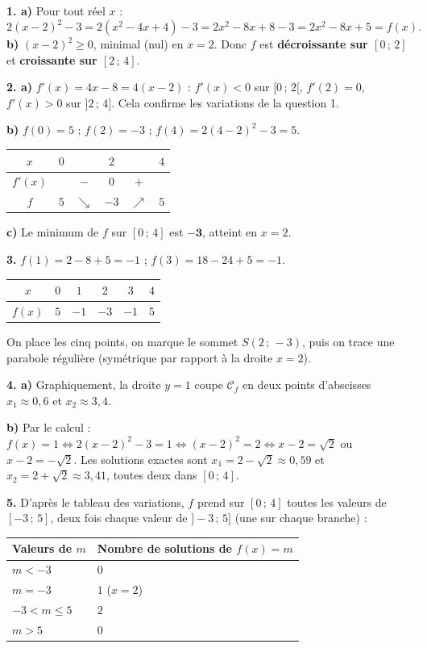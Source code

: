 \documentclass[11pt]{article}
\begin{document}
\begin{corrige}
\textbf{1. a)} Pour tout réel $x$ :
\[ 2(x-2)^{2}-3=2(x^{2}-4x+4)-3=2x^{2}-8x+8-3=2x^{2}-8x+5=f(x). \]
\textbf{b)} $(x-2)^{2}\geq 0$, minimal (nul) en $x=2$. Donc $f$ est \textbf{décroissante sur $[0\,;\,2]$} et \textbf{croissante sur $[2\,;\,4]$}.

\textbf{2. a)} $f'(x)=4x-8=4(x-2)$ : $f'(x)<0$ sur $[0\,;\,2[$, $f'(2)=0$, $f'(x)>0$ sur $]2\,;\,4]$. Cela confirme les variations de la question 1.

\textbf{b)} $f(0)=5$ ; $f(2)=-3$ ; $f(4)=2(4-2)^{2}-3=5$.
\begin{center}
\begin{tabular}{|c|ccccc|}\hline $x$ & $0$ & & $2$ & & $4$ \\ \hline $f'(x)$ & & $-$ & $0$ & $+$ & \\ \hline $f$ & $5$ & $\searrow$ & $-3$ & $\nearrow$ & $5$ \\ \hline\end{tabular}
\end{center}

\textbf{c)} Le minimum de $f$ sur $[0\,;\,4]$ est $\mathbf{-3}$, atteint en $x=2$.

\textbf{3.} $f(1)=2-8+5=-1$ ; $f(3)=18-24+5=-1$.
\begin{center}
\begin{tabular}{|c|ccccc|}\hline
$x$ & $0$ & $1$ & $2$ & $3$ & $4$ \\ \hline
$f(x)$ & $5$ & $-1$ & $-3$ & $-1$ & $5$ \\ \hline
\end{tabular}
\end{center}
On place les cinq points, on marque le sommet $S(2\,;\,-3)$, puis on trace une parabole régulière (symétrique par rapport à la droite $x=2$).

\textbf{4. a)} Graphiquement, la droite $y=1$ coupe $\mathcal{C}_{f}$ en deux points d'abscisses $x_{1}\approx 0,6$ et $x_{2}\approx 3,4$.

\textbf{b)} Par le calcul : $f(x)=1\Leftrightarrow 2(x-2)^{2}-3=1\Leftrightarrow (x-2)^{2}=2\Leftrightarrow x-2=\sqrt{2}$ ou $x-2=-\sqrt{2}$. Les solutions exactes sont $x_{1}=2-\sqrt{2}\approx 0,59$ et $x_{2}=2+\sqrt{2}\approx 3,41$, toutes deux dans $[0\,;\,4]$.

\textbf{5.} D'après le tableau des variations, $f$ prend sur $[0\,;\,4]$ toutes les valeurs de $[-3\,;\,5]$, deux fois chaque valeur de $]-3\,;\,5]$ (une sur chaque branche) :
\begin{center}
\begin{tabularx}{\linewidth}{|l|X|}\hline
Valeurs de $m$ & Nombre de solutions de $f(x)=m$ \\ \hline
$m<-3$ & $0$ \\ \hline
$m=-3$ & $1$ ($x=2$) \\ \hline
$-3<m\leq 5$ & $2$ \\ \hline
$m>5$ & $0$ \\ \hline
\end{tabularx}
\end{center}


\end{corrige}
\end{document}
